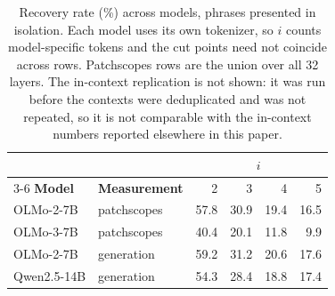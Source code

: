 \begin{table}[t]
\centering\small
\begin{tabular}{llrrrr}
\toprule
& & \multicolumn{4}{c}{$i$} \\
\cmidrule(lr){3-6}
\textbf{Model} & \textbf{Measurement} & 2 & 3 & 4 & 5 \\
\midrule
OLMo-2-7B & patchscopes & 57.8 & 30.9 & 19.4 & 16.5 \\
OLMo-3-7B & patchscopes & 40.4 & 20.1 & 11.8 & 9.9 \\
OLMo-2-7B & generation & 59.2 & 31.2 & 20.6 & 17.6 \\
Qwen2.5-14B & generation & 54.3 & 28.4 & 18.8 & 17.4 \\
\bottomrule
\end{tabular}
\caption{Recovery rate (\%) across models, phrases presented in isolation. Each
model uses its own tokenizer, so $i$ counts model-specific tokens and the cut
points need not coincide across rows. Patchscopes rows are the union over all 32
layers. The in-context replication is not shown: it was run before the contexts
were deduplicated and was not repeated, so it is not comparable with the
in-context numbers reported elsewhere in this paper.}
\label{tab:replication}
\end{table}
